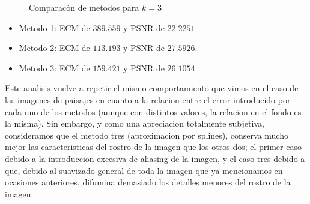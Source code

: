 \begin{figure}[H]
    \centering
    \qquad
    \qquad
    \caption{Comparacón de metodos para $k = 3$}
    \label{fig:example}
\end{figure}


\begin{itemize}
 \item Metodo 1: ECM de $389.559$ y PSNR de $22.2251$.
 \item Metodo 2: ECM de $113.193$ y PSNR de $27.5926$.
 \item Metodo 3: ECM de $159.421$ y PSNR de $26.1054$
\end{itemize}

Este analisis vuelve a repetir el mismo comportamiento que vimos en el caso de las imagenes de paisajes en cuanto a la relacion entre el error introducido por cada uno de los metodos (aunque con distintos valores, la relacion en el fondo es la misma). Sin embargo, y como una apreciacion totalmente subjetiva, consideramos que el metodo tres (aproximacion por splines), conserva mucho mejor las caracteristicas del rostro de la imagen que los otros dos; el primer caso debido a la introduccion excesiva de aliasing de la imagen, y el caso tres debido a que, debido al suavizado general de toda la imagen que ya mencionamos en ocasiones anteriores, difumina demasiado los detalles menores del rostro de la imagen.

